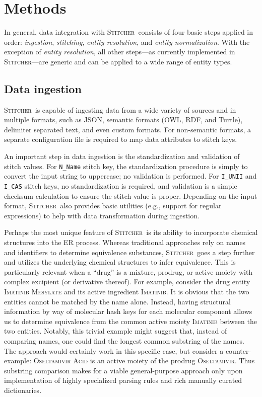 \documentclass{bmcart}
\newcommand\st{\textsc{Stitcher}}
\begin{document}
\section*{Methods}\label{sec:methods}
In general, data integration with \st\ consists of four basic
steps applied in order: \emph{ingestion}, \emph{stitching},
\emph{entity resolution}, and \emph{entity normalization}. With
the exception of \emph{entity resolution}, all other steps---as 
currently implemented in \st---are generic and can be applied to a
wide range of entity types.

\subsection*{Data ingestion}\label{sec:methods-ingest}
\st\ is capable of ingesting data from a wide variety of sources and
in multiple formats, such as JSON, semantic formats (OWL, RDF, and Turtle), 
delimiter separated text, and even custom formats. For non-semantic formats, 
a separate configuration file is required to map data attributes to stitch keys. 

An important step in data ingestion is the standardization and
validation of stitch values. For \texttt{N\_Name} stitch key, the
standardization procedure is simply to convert the input string to
uppercase; no validation is performed. For \texttt{I\_UNII}
and \texttt{I\_CAS} stitch keys, no standardization is required, and
validation is a simple checksum calculation to ensure the stitch value
is proper. Depending on the input format, \st\ also provides basic
utilities (e.g., support for regular expressions) to help with data transformation
during ingestion. 

Perhaps the most unique feature of \st\ is its ability to incorporate
chemical structures into the ER process. Whereas
traditional approaches rely on names and identifiers to determine
equivalence substances, \st\ goes a step further and utilizes the
underlying chemical structures to infer equivalence. This 
is particularly relevant when a ``drug'' is a mixture, prodrug, or
active moiety with complex excipient (or derivative thereof). For
example, consider the drug entity \textsc{Imatinib Mesylate} and its
active ingredient \textsc{Imatinib}. It is obvious that the two
entities cannot be matched by the name alone. Instead, having structural
information by way of molecular hash keys for each molecular component
allows us to determine equivalence from the common active
moiety \textsc{Imatinib} between the two entities. Notably, this trivial example
might suggest that, instead of comparing names, one could find the
longest common substring of the names. The approach would certainly
work in this specific case, but consider a counter-example: \textsc{Oseltamivir Acid} 
is an active moiety of the prodrug \textsc{Oseltamivir}. 
Thus substring comparison makes for a viable general-purpose approach only 
upon implementation of highly specialized parsing rules and rich manually curated dictionaries.
\end{document}
